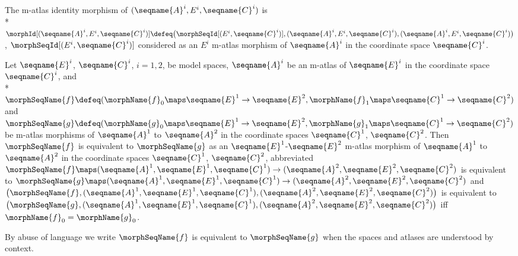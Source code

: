 \documentclass{article}
\begin{document}
\begin{definition}
The m-atlas identity morphism of
$(\seqname{A}^i, E^i, \seqname{C}^i)$ is \\*
$
\morphId[{{(\seqname{A}^i, E^i, \seqname{C}^i)}}] \defeq
\bigl (
  \morphSeqId[{{(E^i,\seqname{C}^i)}}],
  (\seqname{A}^i, E^i, \seqname{C}^i),
  (\seqname{A}^i, E^i, \seqname{C}^i)
\bigr )
$,\hspace{1pt}
$
 \morphSeqId%
   [
     {(E^i, \seqname{C}^i)}
   ]
$
considered as an $E^i$ m-atlas morphism of $\seqname{A}^i$ in
the coordinate space $\seqname{C}^i$.
\end{definition}

\begin{definition}
\label{def:M-ATLmorphequiv}
Let $\seqname{E}^i$, $\seqname{C}^i$, $i=1,2$, be model spaces,
$\seqname{A}^i$ be an m-atlas of $\seqname{E}^i$ in the coordinate space
$\seqname{C}^i$, and \\*
$
  \morphSeqName{f} \defeq
  (
    \morphName{f}_0 \maps \seqname{E}^1 \to \seqname{E}^2,
    \morphName{f}_1 \maps \seqname{C}^1 \to \seqname{C}^2
  )
$ and
$
  \morphSeqName{g} \defeq
  (
    \morphName{g}_0 \maps \seqname{E}^1 \to \seqname{E}^2,
    \morphName{g}_1 \maps \seqname{C}^1 \to \seqname{C}^2
  )
$
be m-atlas morphisms of $\seqname{A}^1$ to $\seqname{A}^2$ in the
coordinate spaces $\seqname{C}^1$, $\seqname{C}^2$.  Then
$\morphSeqName{f}$ is equivalent to $\morphSeqName{g}$ as an
$\seqname{E}^1$-$\seqname{E}^2$ m-atlas morphism of
$\seqname{A}^1$ to $\seqname{A}^2$ in the coordinate spaces
$\seqname{C}^1$, $\seqname{C}^2$, abbreviated
$
  \morphSeqName{f} \maps
  (\seqname{A}^1, \seqname{E}^1, \seqname{C}^1) \to
  (\seqname{A}^2, \seqname{E}^2, \seqname{C}^2)
$
is equivalent to
$
  \morphSeqName{g} \maps
  (\seqname{A}^1, \seqname{E}^1, \seqname{C}^1) \to
  (\seqname{A}^2, \seqname{E}^2, \seqname{C}^2)
$
and
$
  \bigl (
    \morphSeqName{f},
    (\seqname{A}^1, \seqname{E}^1, \seqname{C}^1),
    (\seqname{A}^2, \seqname{E}^2, \seqname{C}^2)
  \bigr )
$
is equivalent to
$
  \bigl (
    \morphSeqName{g},
    (\seqname{A}^1, \seqname{E}^1, \seqname{C}^1),
    (\seqname{A}^2, \seqname{E}^2, \seqname{C}^2)
  \bigr )
$
iff $\morphName{f}_0 = \morphName{g}_0$.

By abuse of language we write $\morphSeqName{f}$ is equivalent to
$\morphSeqName{g}$ when the spaces and atlases are understood by context.


\end{definition}
\end{document}
